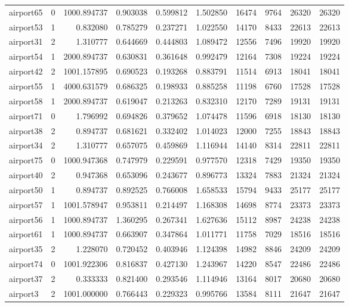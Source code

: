\begin{longtable}{|l|r|r|r|r|r|r|r|r|r|}
airport65 & 0 & 1000.894737 & 0.903038 & 0.599812 & 1.502850 & 16474 & 9764 & 26320 & 26320 \\
airport53 & 1 & 0.832080 & 0.785279 & 0.237271 & 1.022550 & 14170 & 8433 & 22613 & 22613 \\
airport31 & 2 & 1.310777 & 0.644669 & 0.444803 & 1.089472 & 12556 & 7496 & 19920 & 19920 \\
airport54 & 1 & 2000.894737 & 0.630831 & 0.361648 & 0.992479 & 12164 & 7308 & 19224 & 19224 \\
airport42 & 2 & 1001.157895 & 0.690523 & 0.193268 & 0.883791 & 11514 & 6913 & 18041 & 18041 \\
airport55 & 1 & 4000.631579 & 0.686325 & 0.198933 & 0.885258 & 11198 & 6760 & 17528 & 17528 \\
airport58 & 1 & 2000.894737 & 0.619047 & 0.213263 & 0.832310 & 12170 & 7289 & 19131 & 19131 \\
airport71 & 0 & 1.796992 & 0.694826 & 0.379652 & 1.074478 & 11596 & 6918 & 18130 & 18130 \\
airport38 & 2 & 0.894737 & 0.681621 & 0.332402 & 1.014023 & 12000 & 7255 & 18843 & 18843 \\
airport34 & 2 & 1.310777 & 0.657075 & 0.459869 & 1.116944 & 14140 & 8314 & 22811 & 22811 \\
airport75 & 0 & 1000.947368 & 0.747979 & 0.229591 & 0.977570 & 12318 & 7429 & 19350 & 19350 \\
airport40 & 2 & 0.947368 & 0.653096 & 0.243677 & 0.896773 & 13324 & 7883 & 21324 & 21324 \\
airport50 & 1 & 0.894737 & 0.892525 & 0.766008 & 1.658533 & 15794 & 9433 & 25177 & 25177 \\
airport57 & 1 & 1001.578947 & 0.953811 & 0.214497 & 1.168308 & 14698 & 8774 & 23373 & 23373 \\
airport56 & 1 & 1000.894737 & 1.360295 & 0.267341 & 1.627636 & 15112 & 8987 & 24238 & 24238 \\
airport61 & 1 & 1000.894737 & 0.663907 & 0.347864 & 1.011771 & 11758 & 7029 & 18516 & 18516 \\
airport35 & 2 & 1.228070 & 0.720452 & 0.403946 & 1.124398 & 14982 & 8846 & 24209 & 24209 \\
airport74 & 0 & 1001.922306 & 0.816837 & 0.427130 & 1.243967 & 14220 & 8547 & 22486 & 22486 \\
airport37 & 2 & 0.333333 & 0.821400 & 0.293546 & 1.114946 & 13164 & 8017 & 20680 & 20680 \\
airport3 & 2 & 1001.000000 & 0.766443 & 0.229323 & 0.995766 & 13584 & 8111 & 21647 & 21647 \\

\end{longtable}
